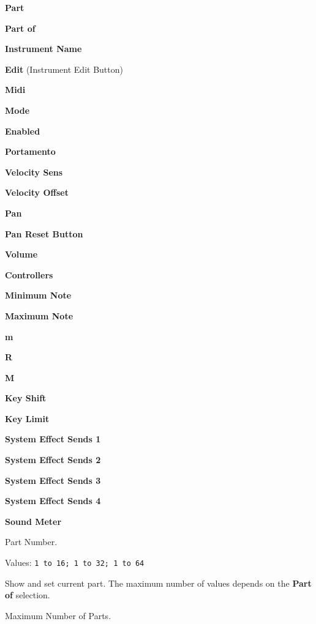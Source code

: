    \begin{enumber}
      \item \textbf{Part}
      \item \textbf{Part of}
      \item \textbf{Instrument Name}
      \item \textbf{Edit} (Instrument Edit Button)
      \item \textbf{Midi}
      \item \textbf{Mode}
      \item \textbf{Enabled}
      \item \textbf{Portamento}
      \item \textbf{Velocity Sens}
      \item \textbf{Velocity Offset}
      \item \textbf{Pan}
      \item \textbf{Pan Reset Button}
      \item \textbf{Volume}
      \item \textbf{Controllers}
      \item \textbf{Minimum Note}
      \item \textbf{Maximum Note}
      \item \textbf{m}
      \item \textbf{R}
      \item \textbf{M}
      \item \textbf{Key Shift}
      \item \textbf{Key Limit}
      \item \textbf{System Effect Sends 1}
      \item \textbf{System Effect Sends 2}
      \item \textbf{System Effect Sends 3}
      \item \textbf{System Effect Sends 4}
      \item \textbf{Sound Meter}
   \end{enumber}

   \setcounter{ItemCounter}{0}      %

   Part Number.

   Values: \texttt{1 to 16; 1 to 32; 1 to 64 }

   Show and set current part.  The maximum number of values depends on the
   \textbf{Part of} selection.

   Maximum Number of Parts.


